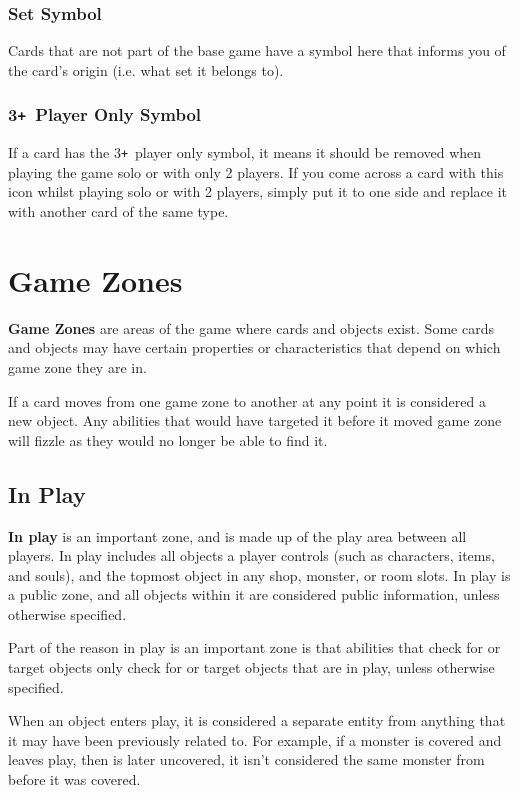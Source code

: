 \documentclass[10pt, a4paper, twoside]{article} %
\def\plus{\texttt{+}}
\begin{document}
    \subsubsection*{Set Symbol}
    Cards that are not part of the base game have a symbol here that informs you of the card’s origin (i.e. what set it belongs to).
    \subsubsection*{3\plus\ Player Only Symbol}
    If a card has the 3\plus\ player only symbol, it means it should be removed when playing the game solo or with only 2 players. If you come across a card with this icon whilst playing solo or with 2 players, simply put it to one side and replace it with another card of the same type.

    \section{Game Zones}
    \label{zones}
    \textbf{Game Zones} are areas of the game where cards and objects exist. Some cards and objects may have certain properties or characteristics that depend on which game zone they are in.

    If a card moves from one game zone to another at any point it is considered a new object. Any abilities that would have targeted it before it moved game zone will fizzle as they would no longer be able to find it.

    \subsection{In Play}
    \textbf{In play} is an important zone, and is made up of the play area between all players. In play includes all objects a player controls (such as characters, items, and souls), and the topmost object in any shop, monster, or room slots. In play is a public zone, and all objects within it are considered public information, unless otherwise specified.

    Part of the reason in play is an important zone is that abilities that check for or target objects only check for or target objects that are in play, unless otherwise specified.

    When an object enters play, it is considered a separate entity from anything that it may have been previously related to. For example, if a monster is covered and leaves play, then is later uncovered, it isn’t considered the same monster from before it was covered.
\end{document}
